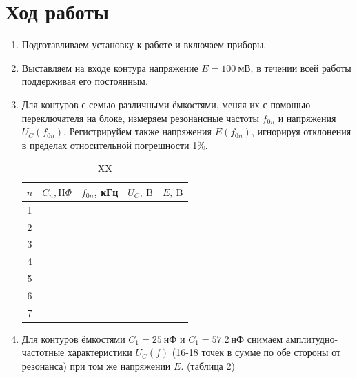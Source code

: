 \documentclass[a4paper, 12pt]{article}%
\begin{document}
\section{Ход работы}
\begin{enumerate}
\item Подготавливаем установку к работе и включаем приборы.

\item Выставляем на входе контура напряжение $E = 100~\text{мВ}$, в течении всей работы поддерживая его постоянным.


\item Для контуров с семью различными ёмкостями, меняя их с помощью переключателя на
блоке, измеряем резонансные частоты $f_{0n}$ и напряжения $U_C(f_{0n})$. Регистрируйем также
напряжения $E(f_{0n})$, игнорируя отклонения в пределах относительной погрешности 1$\%$.

\begin{table}[h]
\begin{center}
\begin{tabular}{|c|c|c|c|c|}
\hline$n$ & $C_{n}, \mathrm{H} \Phi$ & $f_{0 n}$, кГц & $U_{C}, \mathrm{~B}$ & $E, \mathrm{~B}$ \\
\hline 1 &  &  &  &  \\
\hline 2 &  &  &  &  \\
\hline 3 &  &  &  &  \\
\hline 4 &  &  &  &  \\
\hline 5 &  &  &  &  \\
\hline 6 &  &  &  &  \\
\hline 7 &  &  &  &  \\
\hline
\end{tabular}
\end{center}
\caption{XX}
\end{table}



\item Для контуров ёмкостями $C_1 = 25~\text{нФ}$ и $C_1 = 57.2~\text{нФ}$ снимаем амплитудно-частотные характеристики $U_C(f)$ (16-18 точек
в сумме по обе стороны от резонанса) при том же напряжении $E$. (таблица 2)




\end{enumerate}
\end{document}
